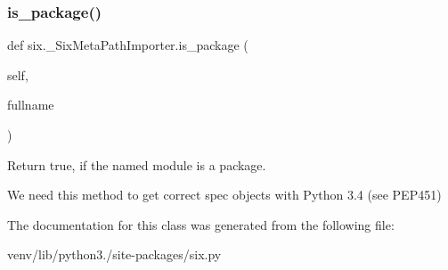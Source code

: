 \subsubsection{\texorpdfstring{is\+\_\+package()}{is\_package()}}
{\footnotesize\ttfamily def six.\+\_\+\+Six\+Meta\+Path\+Importer.\+is\+\_\+package (\begin{DoxyParamCaption}\item[{}]{self,  }\item[{}]{fullname }\end{DoxyParamCaption})}

\begin{DoxyVerb}Return true, if the named module is a package.

We need this method to get correct spec objects with
Python 3.4 (see PEP451)
\end{DoxyVerb}
 

The documentation for this class was generated from the following file\+:\begin{DoxyCompactItemize}
\item 
venv/lib/python3./site-\/packages/six.\+py\end{DoxyCompactItemize}
